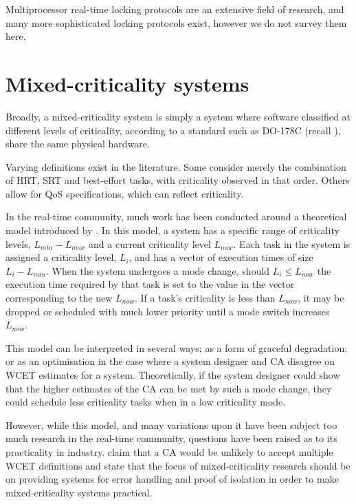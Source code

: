 Multiprocessor real-time locking protocols are an extensive field of research, and 
many more sophisticated locking protocols exist, however we do not survey them here.

\section{Mixed-criticality systems}
\label{s:mixed-criticality}

Broadly, a mixed-criticality system is simply a system where software classified at different levels
of criticality, according to a standard such as DO-178C (recall ), share
the same physical hardware. 

Varying definitions exist in the literature. Some consider merely
the combination of \gls{HRT}, \gls{SRT} and best-effort tasks, with criticality observed in that order.
Others allow for \gls{QoS} specifications, which can reflect criticality. 

In the real-time community, much work has been
conducted around a theoretical model introduced by \citet{Vestal_07}. In this model, a system has
a specific range of criticality levels, $L_{min}-L_{max}$ and a current criticality level
$L_{now}$. Each task in the system is assigned a criticality level, $L_{i}$, and has a vector of
execution times of size $L_{i}-L_{min}$. When the system undergoes a mode change, should $L_{i}
\leq L_{now}$ the execution time required by that task is set to the value in the vector
corresponding to the new $L_{now}$. If a task's criticality is less than $L_{now}$, it may be dropped
or scheduled with much lower priority until a mode switch increases $L_{now}$. 

This model can be interpreted in several ways; as a form of graceful degradation; or as an
optimisation in the case where a system designer and \gls{CA} disagree on \gls{WCET}
estimates for a system. Theoretically, if the system designer could show that the higher estimates
of the \gls{CA} can be met by such a mode change, they could schedule less criticality tasks when in
a low criticality mode. 

However, while this model, and many variations upon it have been subject too much research in the
real-time community, questions have been raised as to its practicality in industry.
\citet{Ernst_DiNatale_16} claim that a \gls{CA} would be unlikely to accept multiple \gls{WCET}
definitions and state that the focus of mixed-criticality research should be on providing systems
for error handling and proof of isolation in order to make mixed-criticality systems practical. 

